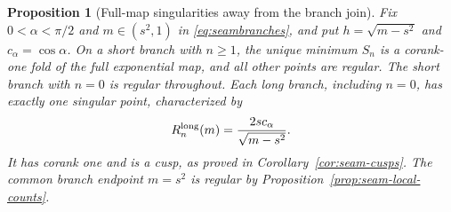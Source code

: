 \documentclass[11pt,a4paper]{article}
\newtheorem{proposition}[theorem]{Proposition}
\theoremstyle{remark}\newtheorem{remark}[theorem]{Remark}
\begin{document}
\begin{proposition}[Full-map singularities away from the branch join]
\label{prop:seam-singularities}
Fix $0<\alpha<\pi/2$ and $m\in(s^2,1)$ in
\eqref{eq:seambranches}, and put $h=\sqrt{m-s^2}$ and
$c_\alpha=\cos\alpha$.
On a short branch with $n\ge1$, the unique minimum $S_n$ is a
corank-one fold of the full exponential map, and all other points
are regular. The short branch with $n=0$ is regular throughout.
Each long branch, including $n=0$, has exactly one singular point,
characterized by
\begin{equation}\label{eq:seam-long-singular}
 R_n^{\rm long}(m)=\frac{2sc_\alpha}{\sqrt{m-s^2}}.
\end{equation}
It has corank one and is a cusp, as proved in
Corollary~\ref{cor:seam-cusps}. The common branch endpoint $m=s^2$
is regular by Proposition~\ref{prop:seam-local-counts}.
\end{proposition}
\end{document}
